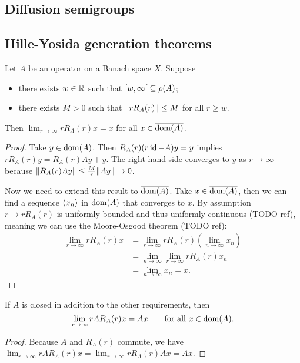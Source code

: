 \subsection{Diffusion semigroups}

\subsection{Hille-Yosida generation theorems}
\begin{lemma} \label{resolventLimitLemma}
Let $A$ be an operator on a Banach space $X$. Suppose
\begin{itemize}
\item there exists $w\in \mathbb{R}$ such that $\interval[co]{w,\infty} \subseteq \res(A)$;
\item there exists $M>0$ such that $\lVert r R_A(r)\rVert\leq M$ for all $r \geq w$.
\end{itemize}
Then $\lim_{r\to \infty} r R_A(r)x = x$ for all $x\in \overline{\operatorname{dom}(A)}$.
\end{lemma}
\begin{proof}
Take $y\in \operatorname{dom}(A)$. Then $R_A(r)(r\operatorname{id} - A)y = y$ implies $r R_A(r)y = R_A(r)Ay + y$. The right-hand side converges to $y$ as $r\to\infty$ because $\lVert R_A(r)Ay\rVert \leq \frac{M}{r}\lVert Ay\rVert \to 0$.

Now we need to extend this result to $\overline{\operatorname{dom}(A)}$. Take $x\in \overline{\operatorname{dom}(A)}$, then we can find a sequence $\left\langle x_n \right\rangle$ in $\operatorname{dom}(A)$ that converges to $x$. By assumption $r \to r R_A(r)$ is uniformly bounded and thus uniformly continuous (TODO ref), meaning we can use the Moore-Osgood theorem (TODO ref):
\begin{align*}
\lim_{r\to \infty} r R_A(r)x &= \lim_{r\to \infty} r R_A(r)\left(\lim_{n\to\infty}x_n\right) \\
&= \lim_{n\to\infty}\lim_{r\to \infty} r R_A(r)x_n \\
&= \lim_{n\to\infty}x_n = x.
\end{align*}
\end{proof}
\begin{corollary} \label{YosidaApproximantsLemma}
If $A$ is closed in addition to the other requirements, then
\[ \lim_{r\to \infty} r AR_A(r)x = Ax \qquad \text{for all $x\in \operatorname{dom}(A)$.} \]
\end{corollary}
\begin{proof}
Because $A$ and $R_A(r)$ commute, we have $\lim_{r\to \infty} r AR_A(r)x = \lim_{r\to \infty} r R_A(r)Ax =Ax$.
\end{proof}

